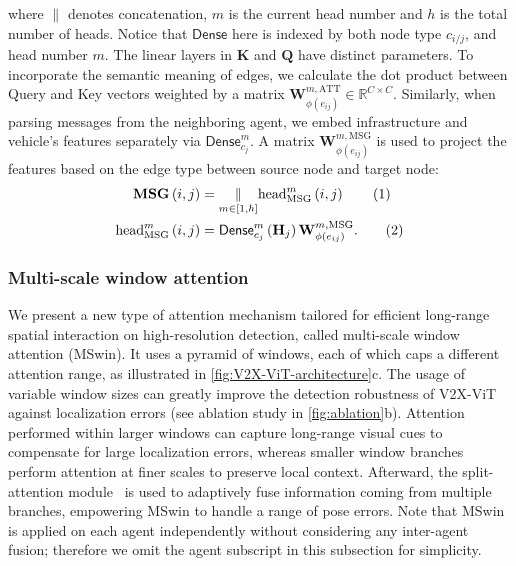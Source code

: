 \documentclass[runningheads]{llncs}
\newcommand\numberthis{\addtocounter{equation}{1}\tag{\theequation}}
\begin{document}
where $\|$ denotes concatenation, $m$ is the current head number and $h$ is the total number of heads. Notice that $\mathsf{Dense}$ here is indexed by both node type $c_{i/j}$, and head number $m$. The linear layers in $\textbf{K}$ and $\textbf{Q}$ have distinct parameters. To incorporate the semantic meaning of edges, we calculate the dot product between Query and Key vectors weighted by a matrix $\mathbf{W}_{\phi\left(e_{ij}\right)}^{m, \mathrm{ATT}}\in\mathbb{R}^{C\times C}$. Similarly, when parsing messages from the neighboring agent, we embed infrastructure and vehicle's features separately via $\mathsf{Dense}_{c_j}^m$. A matrix $\mathbf{W}_{\phi\left(e_{ij}\right)}^{m,\mathrm{MSG}}$ is used to project the features based on the edge type between source node and target node:
\vspace{-2mm}
\begin{align*}
    \mathbf{MSG}\left(i,j\right)&=\underset{m\in[1,h]}{\|}\text{head}^m_{\mathrm{MSG}}\left(i ,j\right)\numberthis \label{5}\\
    \text{head}^m_{\mathrm{MSG}}\left(i,j\right)&=\mathsf{Dense}^m_{c_j}\left(\mathbf{H}_j\right)\mathbf{W}_{\phi\left(e_{ij}\right)}^{m,\mathrm{MSG}} .\numberthis \label{6}
\end{align*}

\subsubsection{Multi-scale window attention}
\label{sssec:mswin}
We present a new type of attention mechanism tailored for efficient long-range spatial interaction on high-resolution detection, called multi-scale window attention (MSwin). It uses a pyramid of windows, each of which caps a different attention range, as illustrated in \cref{fig:V2X-ViT-architecture}c. The usage of variable window sizes can greatly improve the detection robustness of V2X-ViT against localization errors (see ablation study in \cref{fig:ablation}b). Attention performed within larger windows can capture long-range visual cues to compensate for large localization errors, whereas smaller window branches perform attention at finer scales to preserve local context. Afterward, the split-attention module~\cite{zhang2020resnest} is used to adaptively fuse information coming from multiple branches, empowering MSwin to handle a range of pose errors. Note that MSwin is applied on each agent independently without considering any inter-agent fusion; therefore we omit the agent subscript in this subsection for simplicity.
\end{document}
